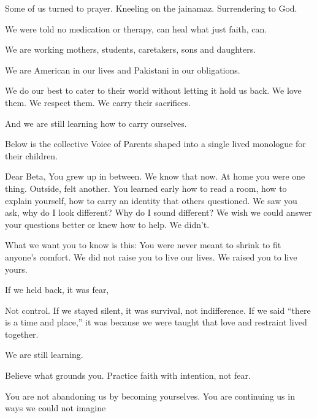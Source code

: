 \begin{FoundPoem}
Some of us turned to prayer.
Kneeling on the jainamaz.
Surrendering to God.

We were told no medication or therapy, can heal 
what just faith, can.

We are working mothers, students, caretakers, sons and daughters.

We are American in our lives and Pakistani in our obligations.

We do our best to cater to their world
 without letting it hold us back.
We love them.
We respect them.
We carry their sacrifices.

And we are still learning
 how to carry ourselves.    
\end{FoundPoem}

Below is the collective Voice of Parents shaped into a single lived monologue for their children.

\begin{FoundPoem}
Dear Beta,
You grew up in between.
We know that now.
 At home you were one thing.
 Outside, felt  another.
 You learned early how to read a room,
how to explain yourself, how to carry an identity that others questioned.
We saw you ask, why do I look different? Why do I sound different?
We wish we could answer your questions better or knew how to help.
We didn’t.


What we want you to know is this: You were never meant to shrink to fit anyone’s comfort.
We did not raise you to live our lives.
We raised you to live yours.

If we held back, it was fear,

Not control.
If we stayed silent, it was survival, not indifference.
If we said ``there is a time and place,''
it was because we were taught that love and restraint lived together.

We are still learning.

Believe what grounds you.
Practice faith with intention, not fear.

You are not abandoning us by becoming yourselves.
You are continuing us in ways we could not imagine
\end{FoundPoem}